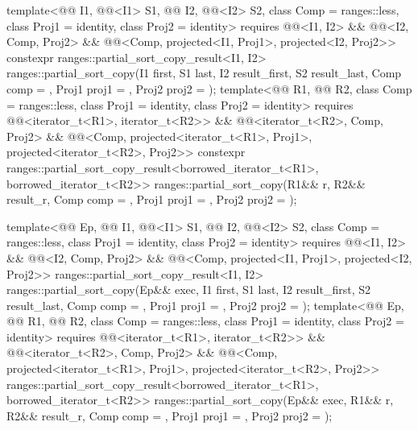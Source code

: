 \begin{itemdecl}
template<@@ I1, @@<I1> S1, @@ I2, @@<I2> S2,
         class Comp = ranges::less, class Proj1 = identity, class Proj2 = identity>
  requires @@<I1, I2> && @@<I2, Comp, Proj2> &&
           @@<Comp, projected<I1, Proj1>, projected<I2, Proj2>>
  constexpr ranges::partial_sort_copy_result<I1, I2>
    ranges::partial_sort_copy(I1 first, S1 last, I2 result_first, S2 result_last,
                              Comp comp = {}, Proj1 proj1 = {}, Proj2 proj2 = {});
template<@@ R1, @@ R2, class Comp = ranges::less,
         class Proj1 = identity, class Proj2 = identity>
  requires @@<iterator_t<R1>, iterator_t<R2>> &&
           @@<iterator_t<R2>, Comp, Proj2> &&
           @@<Comp, projected<iterator_t<R1>, Proj1>,
                                      projected<iterator_t<R2>, Proj2>>
  constexpr ranges::partial_sort_copy_result<borrowed_iterator_t<R1>, borrowed_iterator_t<R2>>
    ranges::partial_sort_copy(R1&& r, R2&& result_r, Comp comp = {},
                              Proj1 proj1 = {}, Proj2 proj2 = {});

template<@@ Ep, @@ I1, @@<I1> S1,
         @@ I2, @@<I2> S2,
         class Comp = ranges::less, class Proj1 = identity, class Proj2 = identity>
  requires @@<I1, I2> && @@<I2, Comp, Proj2> &&
           @@<Comp, projected<I1, Proj1>, projected<I2, Proj2>>
  ranges::partial_sort_copy_result<I1, I2>
    ranges::partial_sort_copy(Ep&& exec, I1 first, S1 last, I2 result_first, S2 result_last,
                              Comp comp = {}, Proj1 proj1 = {},
                              Proj2 proj2 = {});
template<@@ Ep, @@ R1, @@ R2,
         class Comp = ranges::less, class Proj1 = identity, class Proj2 = identity>
  requires @@<iterator_t<R1>, iterator_t<R2>> &&
           @@<iterator_t<R2>, Comp, Proj2> &&
           @@<Comp, projected<iterator_t<R1>, Proj1>,
                                      projected<iterator_t<R2>, Proj2>>
  ranges::partial_sort_copy_result<borrowed_iterator_t<R1>, borrowed_iterator_t<R2>>
    ranges::partial_sort_copy(Ep&& exec, R1&& r, R2&& result_r, Comp comp = {},
                              Proj1 proj1 = {}, Proj2 proj2 = {});
\end{itemdecl}

